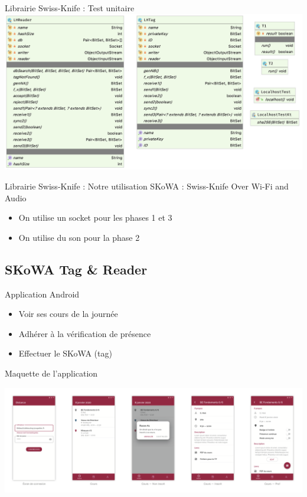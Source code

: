 \documentclass[aspectratio=169]{beamer}
\begin{document}
\begin{frame}{Librairie Swiss-Knife : Test unitaire}
  \centering
  \includegraphics[height=.9\textheight]{../assets/uml_test_detail}
\end{frame}

\begin{frame}{Librairie Swiss-Knife : Notre utilisation}
  SKoWA : Swiss-Knife Over Wi-Fi and Audio
  \bigskip

  \begin{itemize}
    \item On utilise un socket pour les phases 1 et 3
    \item On utilise du son pour la phase 2
  \end{itemize}
\end{frame}

\subsection{SKoWA Tag \& Reader}

\begin{frame}{Application Android}

  \begin{itemize}
    \item Voir ses cours de la journée
    \item Adhérer à la vérification de présence
    \item Effectuer le SKoWA (tag)
  \end{itemize}

\end{frame}

\begin{frame}{Maquette de l'application}
  \begin{adjustwidth}{-1.8em}{2em}
    \centering
    \includegraphics[width=1.1\textwidth]{../assets/maquette.png}
  \end{adjustwidth}
\end{frame}
\end{document}
